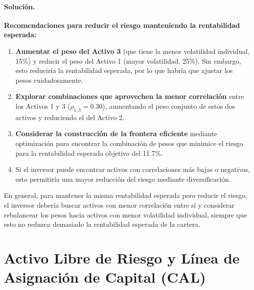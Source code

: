 \documentclass[12pt,a4paper]{article}
\newenvironment{solucion}{\paragraph{Solución.}}{}
\begin{document}
\begin{solucion}
\begin{enumerate}[label=\alph*)]
  \textbf{Recomendaciones para reducir el riesgo manteniendo la rentabilidad esperada:}
  \begin{enumerate}
    \item \textbf{Aumentar el peso del Activo 3} (que tiene la menor volatilidad individual, 15\%) y reducir el peso del Activo 1 (mayor volatilidad, 25\%). Sin embargo, esto reduciría la rentabilidad esperada, por lo que habría que ajustar los pesos cuidadosamente.
    \item \textbf{Explorar combinaciones que aprovechen la menor correlación} entre los Activos 1 y 3 ($\rho_{1,3} = 0.30$), aumentando el peso conjunto de estos dos activos y reduciendo el del Activo 2.
    \item \textbf{Considerar la construcción de la frontera eficiente} mediante optimización para encontrar la combinación de pesos que minimice el riesgo para la rentabilidad esperada objetivo del 11.7\%.
    \item Si el inversor puede encontrar activos con correlaciones más bajas o negativas, esto permitiría una mayor reducción del riesgo mediante diversificación.
  \end{enumerate}

  En general, para mantener la misma rentabilidad esperada pero reducir el riesgo, el inversor debería buscar activos con menor correlación entre sí y considerar rebalancear los pesos hacia activos con menor volatilidad individual, siempre que esto no reduzca demasiado la rentabilidad esperada de la cartera.
\end{enumerate}
\end{solucion}

\section{Activo Libre de Riesgo y Línea de Asignación de Capital (CAL)}
\end{document}
